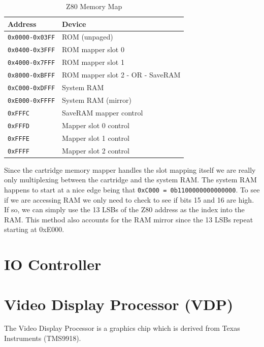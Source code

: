 \documentclass{article}
\begin{document}
\begin{table}[H]
    \centering
    \begin{tabular}{ll}
        \toprule
        \textbf{Address} & \textbf{Device} \\
        \midrule
        \texttt{0x0000-0x03FF} & ROM (unpaged)                    \\
        \texttt{0x0400-0x3FFF} & ROM mapper slot 0                \\
        \texttt{0x4000-0x7FFF} & ROM mapper slot 1                \\
        \texttt{0x8000-0xBFFF} & ROM mapper slot 2 - OR - SaveRAM \\
        \texttt{0xC000-0xDFFF} & System RAM                       \\
        \texttt{0xE000-0xFFFF} & System RAM (mirror)              \\
        \texttt{0xFFFC}       & SaveRAM mapper control           \\
        \texttt{0xFFFD}       & Mapper slot 0 control            \\
        \texttt{0xFFFE}       & Mapper slot 1 control            \\
        \texttt{0xFFFF}       & Mapper slot 2 control            \\
        \bottomrule
    \end{tabular}
    \fontfamily{}\selectfont
    \caption{Z80 Memory Map \protect\cite{mem_map_table}}
\end{table}

Since the cartridge memory mapper handles the slot mapping itself we are really
only multiplexing between the cartridge and the system RAM.  The system RAM
happens to start at a nice edge being that \texttt{0xC000 = 0b1100000000000000}. To see
if we are accessing RAM we only need to check to see if bits 15 and 16 are
high. If so, we can simply use the 13 LSBs of the Z80 address as the index into
the RAM.  This method also accounts for the RAM mirror since the 13 LSBs repeat
starting at 0xE000.

\section{IO Controller}
\section{Video Display Processor (VDP)}

The Video Display Processor is a graphics chip which is derived from Texas
Instruments (TMS9918).
\end{document}
